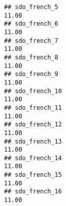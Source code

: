 \documentclass[
]{article}
\begin{document}
\begin{verbatim}
## sdo_french_5                                                                                                                                                                                                                  11.00
## sdo_french_6                                                                                                                                                                                                                  11.00
## sdo_french_7                                                                                                                                                                                                                  11.00
## sdo_french_8                                                                                                                                                                                                                  11.00
## sdo_french_9                                                                                                                                                                                                                  11.00
## sdo_french_10                                                                                                                                                                                                                 11.00
## sdo_french_11                                                                                                                                                                                                                 11.00
## sdo_french_12                                                                                                                                                                                                                 11.00
## sdo_french_13                                                                                                                                                                                                                 11.00
## sdo_french_14                                                                                                                                                                                                                 11.00
## sdo_french_15                                                                                                                                                                                                                 11.00
## sdo_french_16                                                                                                                                                                                                                 11.00

\end{verbatim}
\end{document}
